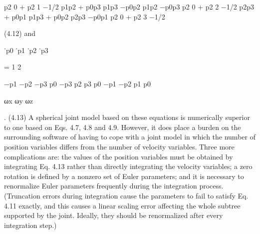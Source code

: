 p2 0 + p2 1 −1/2 p1p2 + p0p3 p1p3 −p0p2 p1p2 −p0p3 p2 0 + p2 2 −1/2 p2p3 + p0p1 p1p3 + p0p2 p2p3 −p0p1 p2 0 + p2 3 −1/2

(4.12) and

˙p0 ˙p1 ˙p2 ˙p3

= 1 2

−p1 −p2 −p3 p0 −p3 p2 p3 p0 −p1 −p2 p1 p0

ωx ωy ωz

. (4.13) A spherical joint model based on these equations is numerically superior to one based on Eqs. 4.7, 4.8 and 4.9. However, it does place a burden on the surrounding software of having to cope with a joint model in which the number of position variables differs from the number of velocity variables. Three more complications are: the values of the position variables must be obtained by integrating Eq. 4.13 rather than directly integrating the velocity variables; a zero rotation is defined by a nonzero set of Euler parameters; and it is necessary to renormalize Euler parameters frequently during the integration process. (Truncation errors during integration cause the parameters to fail to satisfy Eq. 4.11 exactly, and this causes a linear scaling error affecting the whole subtree supported by the joint. Ideally, they should be renormalized after every integration step.)

